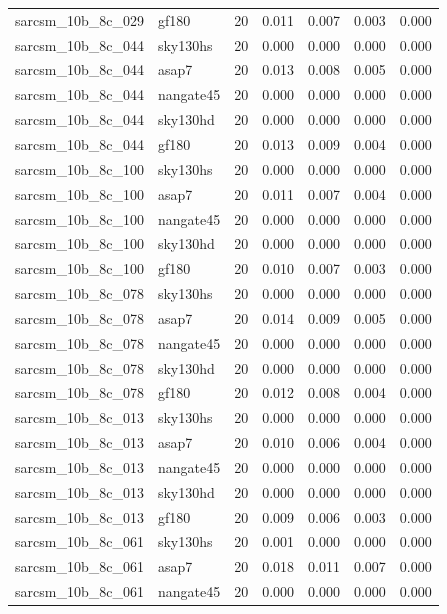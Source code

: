 \begin{tabular}{llrrrrr}
sarcsm\_10b\_8c\_029 & gf180 & 20 & 0.011 & 0.007 & 0.003 & 0.000 \\
sarcsm\_10b\_8c\_044 & sky130hs & 20 & 0.000 & 0.000 & 0.000 & 0.000 \\
sarcsm\_10b\_8c\_044 & asap7 & 20 & 0.013 & 0.008 & 0.005 & 0.000 \\
sarcsm\_10b\_8c\_044 & nangate45 & 20 & 0.000 & 0.000 & 0.000 & 0.000 \\
sarcsm\_10b\_8c\_044 & sky130hd & 20 & 0.000 & 0.000 & 0.000 & 0.000 \\
sarcsm\_10b\_8c\_044 & gf180 & 20 & 0.013 & 0.009 & 0.004 & 0.000 \\
sarcsm\_10b\_8c\_100 & sky130hs & 20 & 0.000 & 0.000 & 0.000 & 0.000 \\
sarcsm\_10b\_8c\_100 & asap7 & 20 & 0.011 & 0.007 & 0.004 & 0.000 \\
sarcsm\_10b\_8c\_100 & nangate45 & 20 & 0.000 & 0.000 & 0.000 & 0.000 \\
sarcsm\_10b\_8c\_100 & sky130hd & 20 & 0.000 & 0.000 & 0.000 & 0.000 \\
sarcsm\_10b\_8c\_100 & gf180 & 20 & 0.010 & 0.007 & 0.003 & 0.000 \\
sarcsm\_10b\_8c\_078 & sky130hs & 20 & 0.000 & 0.000 & 0.000 & 0.000 \\
sarcsm\_10b\_8c\_078 & asap7 & 20 & 0.014 & 0.009 & 0.005 & 0.000 \\
sarcsm\_10b\_8c\_078 & nangate45 & 20 & 0.000 & 0.000 & 0.000 & 0.000 \\
sarcsm\_10b\_8c\_078 & sky130hd & 20 & 0.000 & 0.000 & 0.000 & 0.000 \\
sarcsm\_10b\_8c\_078 & gf180 & 20 & 0.012 & 0.008 & 0.004 & 0.000 \\
sarcsm\_10b\_8c\_013 & sky130hs & 20 & 0.000 & 0.000 & 0.000 & 0.000 \\
sarcsm\_10b\_8c\_013 & asap7 & 20 & 0.010 & 0.006 & 0.004 & 0.000 \\
sarcsm\_10b\_8c\_013 & nangate45 & 20 & 0.000 & 0.000 & 0.000 & 0.000 \\
sarcsm\_10b\_8c\_013 & sky130hd & 20 & 0.000 & 0.000 & 0.000 & 0.000 \\
sarcsm\_10b\_8c\_013 & gf180 & 20 & 0.009 & 0.006 & 0.003 & 0.000 \\
sarcsm\_10b\_8c\_061 & sky130hs & 20 & 0.001 & 0.000 & 0.000 & 0.000 \\
sarcsm\_10b\_8c\_061 & asap7 & 20 & 0.018 & 0.011 & 0.007 & 0.000 \\
sarcsm\_10b\_8c\_061 & nangate45 & 20 & 0.000 & 0.000 & 0.000 & 0.000 \\

\end{tabular}
